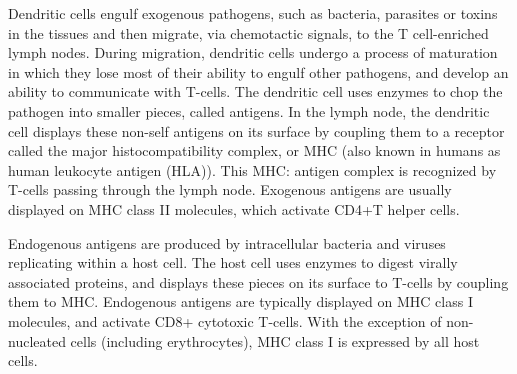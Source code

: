 Dendritic cells engulf exogenous pathogens, such as bacteria, parasites or toxins in the tissues and then migrate, via chemotactic signals, to the T cell-enriched lymph nodes. During migration, dendritic cells undergo a process of maturation in which they lose most of their ability to engulf other pathogens, and develop an ability to communicate with T-cells. The dendritic cell uses enzymes to chop the pathogen into smaller pieces, called antigens. In the lymph node, the dendritic cell displays these non-self antigens on its surface by coupling them to a receptor called the major histocompatibility complex, or MHC (also known in humans as human leukocyte antigen (HLA)). This MHC: antigen complex is recognized by T-cells passing through the lymph node. Exogenous antigens are usually displayed on MHC class II molecules, which activate CD4+T helper cells.

Endogenous antigens are produced by intracellular bacteria and viruses replicating within a host cell. The host cell uses enzymes to digest virally associated proteins, and displays these pieces on its surface to T-cells by coupling them to MHC. Endogenous antigens are typically displayed on MHC class I molecules, and activate CD8+ cytotoxic T-cells. With the exception of non-nucleated cells (including erythrocytes), MHC class I is expressed by all host cells.




